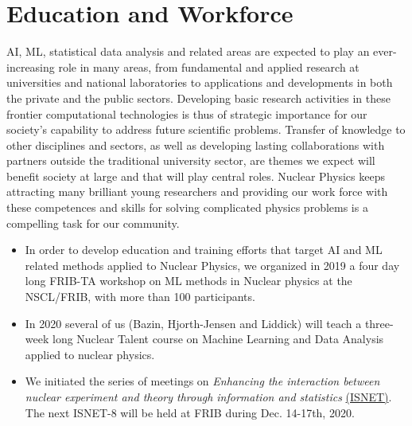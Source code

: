 \documentclass[%
10pt]{article}
\begin{document}
\section{Education and Workforce}

AI, ML, statistical data analysis and related areas are expected to
play an ever-increasing role in many areas, from fundamental and
applied research at universities and national laboratories to
applications and developments in both the private and the public
sectors.
Developing basic research activities in these frontier
computational technologies is thus of strategic importance for our
society’s capability to address future scientific problems. Transfer
of knowledge to other disciplines and sectors, as well as developing
lasting collaborations with partners outside the traditional
university sector, are themes we expect will benefit society at large
and that will play central roles. Nuclear Physics keeps attracting many brilliant young researchers and providing our work force with these competences and skills for solving complicated physics problems is a compelling task for our community.


\begin{itemize}

\item In order to develop education and training efforts that target AI and ML related methods applied to Nuclear Physics, we  organized in 2019 a four day long  FRIB-TA workshop on ML methods in Nuclear physics at the NSCL/FRIB, with more than 100 participants.

\item In 2020 several of us (Bazin, Hjorth-Jensen and Liddick) will teach a three-week long Nuclear Talent course on Machine Learning and Data Analysis applied to nuclear physics. 

\item
We initiated the series of meetings on {\it Enhancing the interaction between nuclear experiment and theory through information and statistics} \href{https://iopscience.iop.org/journal/0954-3899/page/ISNET}{(ISNET)}.  The next ISNET-8 will be held at FRIB during  Dec. 14-17th, 2020.

\end{itemize}
\end{document}
